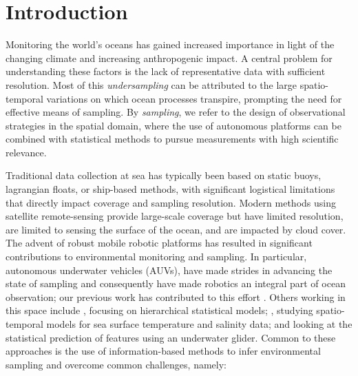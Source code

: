 \documentclass[aoas]{imsart}
\begin{document}
\section{Introduction}

Monitoring the world's oceans has gained increased importance in 
light of the changing climate and increasing anthropogenic impact. A
central problem for understanding these factors is the lack of
representative data with sufficient resolution. Most of this
\emph{undersampling} can be attributed to the large spatio-temporal
variations on which ocean processes transpire, prompting the need for
effective means of sampling. By \emph{sampling}, we refer to the design
of observational strategies in the spatial domain, where the use of
autonomous platforms can be combined with statistical methods to pursue
measurements with high scientific relevance.

Traditional data collection at sea has typically been based on static
buoys, lagrangian floats, or ship-based methods, with significant
logistical limitations that directly impact coverage and sampling
resolution. Modern methods using satellite remote-sensing provide
large-scale coverage but have limited resolution, are limited to
sensing the surface of the ocean, and are impacted by cloud cover. The
advent of robust mobile robotic platforms \cite{Bellingham07} has
resulted in significant contributions to environmental monitoring and
sampling. In particular, autonomous underwater vehicles (AUVs), have made
strides in advancing the state of sampling and consequently have made
robotics an integral part of ocean observation; our previous work
has contributed to this effort
\citep{das11b,Graham2013,Das2015,das15,fossuminformation,fossum18b}.
Others working in this space include \cite{wikle2013modern}, focusing on hierarchical
statistical models; \cite{sahu2008space}, studying spatio-temporal
models for sea surface temperature and salinity data; and
\cite{mellucci2018oceanic} looking at the statistical prediction of
features using an underwater glider. Common to these approaches is the
use of information-based methods to infer environmental sampling and overcome common challenges, namely:
\end{document}
